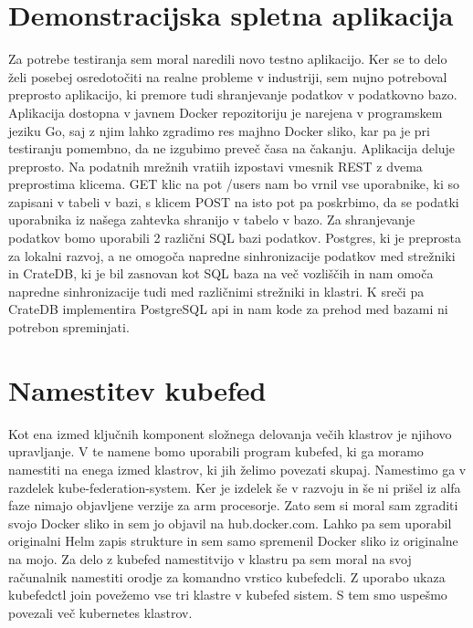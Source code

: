 \documentclass[a4paper, 12pt]{book}
\begin{document}
\section{Demonstracijska spletna aplikacija}
Za potrebe testiranja sem moral naredili novo testno aplikacijo.
Ker se to delo želi posebej osredotočiti na realne probleme v industriji, sem nujno potreboval preprosto aplikacijo, ki premore tudi shranjevanje podatkov v podatkovno bazo.
Aplikacija dostopna v javnem Docker repozitoriju je narejena v programskem jeziku Go, saj z njim lahko zgradimo res majhno Docker sliko, kar pa je pri testiranju pomembno, da ne izgubimo preveč časa na čakanju.
Aplikacija deluje preprosto.
Na podatnih mrežnih vratiih izpostavi vmesnik REST z dvema preprostima klicema.
GET klic na pot /users nam bo vrnil vse uporabnike, ki so zapisani v tabeli v bazi, s klicem POST na isto pot pa poskrbimo, da se podatki uporabnika iz našega zahtevka shranijo v tabelo v bazo.
Za shranjevanje podatkov bomo uporabili 2 različni SQL bazi podatkov.
Postgres, ki je preprosta za lokalni razvoj, a ne omogoča napredne sinhronizacije podatkov med strežniki in CrateDB, ki je bil zasnovan kot SQL baza na več vozliščih in nam omoča napredne sinhronizacije tudi med različnimi strežniki in klastri.
K sreči pa CrateDB implementira PostgreSQL api in nam kode za prehod med bazami ni potrebon spreminjati.


\section{Namestitev kubefed}
Kot ena izmed ključnih komponent složnega delovanja večih klastrov je njihovo upravljanje.
V te namene bomo uporabili program kubefed, ki ga moramo namestiti na enega izmed klastrov, ki jih želimo povezati skupaj.
Namestimo ga v razdelek kube-federation-system.
Ker je izdelek še v razvoju in še ni prišel iz alfa faze nimajo objavljene verzije za arm procesorje.
Zato sem si moral sam zgraditi svojo Docker sliko in sem jo objavil na hub.docker.com.
Lahko pa sem uporabil originalni Helm zapis strukture in sem samo spremenil Docker sliko iz originalne na mojo.
Za delo z kubefed namestitvijo v klastru pa sem moral na svoj računalnik namestiti orodje za komandno vrstico kubefedcli.
Z uporabo ukaza kubefedctl join povežemo vse tri klastre v kubefed sistem.
S tem smo uspešmo povezali več kubernetes klastrov.



\section{}
\end{document}
